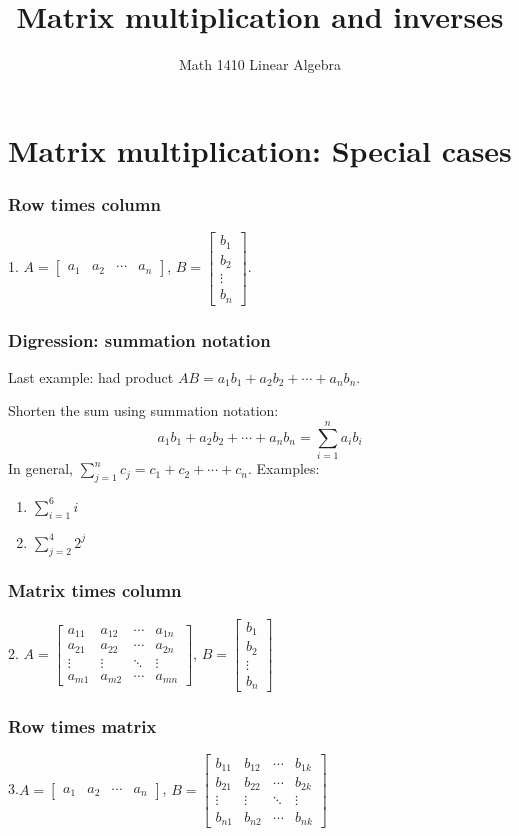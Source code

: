 \documentclass[11pt,t]{beamer}
\date{}
\author{Math 1410 Linear Algebra}
\title{Matrix multiplication and inverses}
\begin{document}
\begin{frame}
\titlepage
\end{frame}

\section{Matrix multiplication: Special cases}
\begin{frame}\frametitle{Row times column}
1. $A = \begin{bmatrix}a_1&a_2&\cdots & a_n\end{bmatrix}$, $B=\begin{bmatrix}b_1\\b_2\\\vdots \\ b_n\end{bmatrix}$.

\end{frame}
\begin{frame}\frametitle{Digression: summation notation}
Last example: had product $AB = a_1b_1+a_2b_2+\cdots+a_nb_n$.

Shorten the sum using \alert{summation notation}:
\[
a_1b_1+a_2b_2+\cdots + a_nb_n = \sum_{i=1}^n a_ib_i
\]
In general, $\displaystyle \sum_{j=1}^n c_j = c_1+c_2+\cdots + c_n$. Examples:
\begin{enumerate}
\item $\displaystyle \sum_{i=1}^6 i$
\item $\displaystyle \sum_{j=2}^4 2^j$
\end{enumerate}
\end{frame}
\begin{frame}\frametitle{Matrix times column}
2. $A = \begin{bmatrix}a_{11}&a_{12}&\cdots & a_{1n}\\a_{21}&a_{22}&\cdots &a_{2n}\\
\vdots & \vdots & \ddots &\vdots\\a_{m1}&a_{m2}&\cdots &a_{mn}\end{bmatrix}$, $B=\begin{bmatrix}b_1\\b_2\\\vdots \\ b_n\end{bmatrix}$
\end{frame}
\begin{frame}\frametitle{Row times matrix}
3.$A = \begin{bmatrix}a_1&a_2&\cdots & a_n\end{bmatrix}$, $B=\begin{bmatrix}b_{11}&b_{12}&\cdots & b_{1k}\\b_{21}&b_{22}&\cdots &b_{2k}\\\vdots & \vdots & \ddots & \vdots\\b_{n1}&b_{n2}&\cdots &b_{nk}\end{bmatrix}$

\end{frame}
\end{document}
